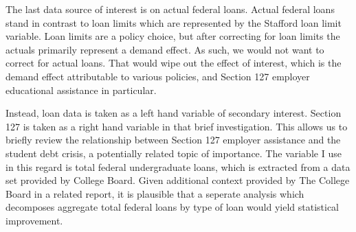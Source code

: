 \documentclass[review]{elsarticle}
\begin{document}

    The last data source of interest is on actual federal loans.
    Actual federal loans stand in contrast to loan limits which are represented by the Stafford loan limit variable.
    Loan limits are a policy choice, but after correcting for loan limits the actuals primarily represent a demand effect.
    As such, we would not want to correct for actual loans.
    That would wipe out the effect of interest,
    which is the demand effect attributable to various policies,
    and Section 127 employer educational assistance in particular.

    Instead, loan data is taken as a left hand variable of secondary interest.
    Section 127 is taken as a right hand variable in that brief investigation.
    This allows us to briefly review the relationship between Section 127 employer assistance
    and the student debt crisis, a potentially related topic of importance.
    The variable I use in this regard is total federal undergraduate loans,
    which is extracted from a data set provided by College Board\cite{cb_excel_2019}.
    Given additional context provided by The College Board in a related report\cite{cb_trends_2019},
    it is plausible that a seperate analysis which decomposes aggregate total federal loans by type of loan would yield statistical improvement.
\end{document}
